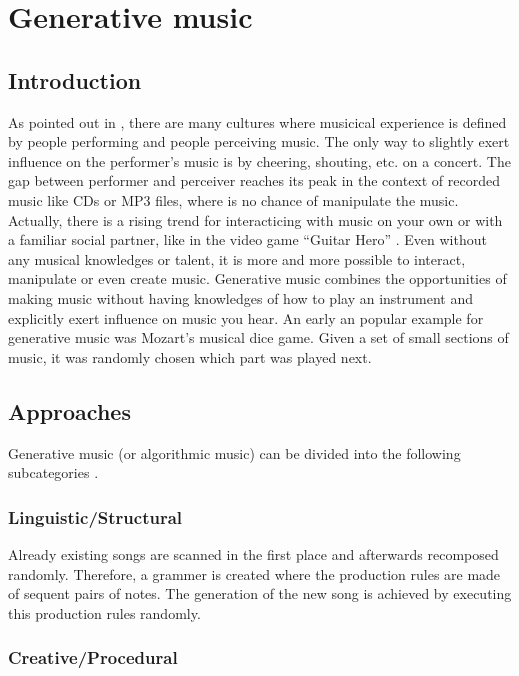 	\section{Generative music}
	

	\subsection{Introduction}

	As pointed out in \cite{Chandra2012}, there are many cultures where musicical experience is defined by people performing and people perceiving music. 
	The only way to slightly exert influence on the performer's music is by cheering, shouting, etc. on a concert. 
	The gap between performer and perceiver reaches its peak in the context of recorded music like CDs or MP3 files, where is no chance of manipulate the music. 
	Actually, there is a rising trend for interacticing with music on your own or with a familiar social partner, like in the video game "`Guitar Hero"' \cite{Chandra2012, Planck2009}. 
	Even without any musical knowledges or talent, it is more and more possible to interact, manipulate or even create music.
	Generative music combines the opportunities of making music without having knowledges of how to play an instrument and explicitly exert influence on music you hear.
	An early an popular example for generative music was Mozart's musical dice game. Given a set of small sections of music, it was randomly chosen which part was played next.


	\subsection{Approaches} 

	Generative music (or algorithmic music) can be divided into the following subcategories \cite{Wooller2005}.

	\subsubsection{Linguistic/Structural}

	Already existing songs are scanned in the first place and afterwards recomposed randomly. Therefore, a grammer is created where the production rules are made of sequent pairs of notes. The generation of the new song is achieved by executing this production rules randomly.

	\subsubsection{Creative/Procedural}

